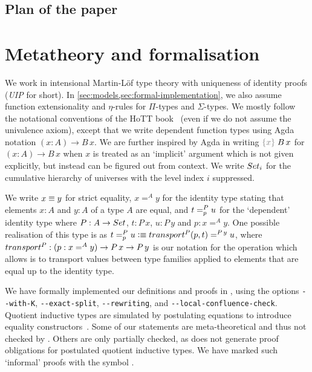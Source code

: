 \documentclass[a4paper,UKenglish,numberwithinsect,cleveref,thm-restate]{lipics-v2021}
\begin{document}
\subsection{Plan of the paper}


\section{Metatheory and formalisation} \label{sec:meta}

We work in intensional Martin-L\"of type theory with uniqueness of identity proofs (\emph{UIP} for short). In \cref{sec:models,sec:formal-implementation}, we also assume function extensionality and $\eta$-rules for $\Pi$-types and $\Sigma$-types.
%
We mostly follow the notational conventions of the HoTT book~\cite{UFP2013} (even if we do not assume the univalence axiom), except that we write dependent function types using Agda notation $(x : A) \to B\,x$.
%
We are further inspired by Agda in writing $\implicit{x}\;B\,x$ for $(x : A) \to B\,x$ when $x$ is treated as an `implicit' argument which is not given explicitly, but instead can be figured out from context.
We write $\Set_i$ for the cumulative hierarchy of universes with the level index $i$ suppressed.

We write $x \jdeq y$ for strict equality, $x =^{A} y$ for the identity type stating that elements $x : A$ and $y : A$ of a type $A$ are equal, and $\dpath{P}{p}{t}{u}$ for the `dependent' identity type where $P : A \to \Set$, $t : P\,x$, $u : P\,y$ and $p : x =^A y$. One possible realisation of this type is as $t =^{P}_{p} u \defeq \transfib{P}{p}{t} =^{P\,y} u$, where $\transfibf{P} : (p : x =^A y) \to P\,x \to P\,y$ is our notation for the operation which allows is to transport values between type families applied to elements that are equal up to the identity type.
%

We have formally implemented our definitions and proofs in \Agda, using the options \texttt{-{}-with-K}, \texttt{-{}-exact-split}, \texttt{-{}-rewriting}, and \texttt{-{}-local-confluence-check}.
Quotient inductive types are simulated by postulating equations to introduce equality constructors~\cite{Licata2011}.
Some of our statements are meta-theoretical and thus not checked by \Agda.
Others are only partially checked, as \Agda does not generate proof obligations for postulated quotient inductive types.
We have marked such `informal' proofs with the symbol \resizebox*{!}{\baselineskip}{\textdbend}.
\end{document}
